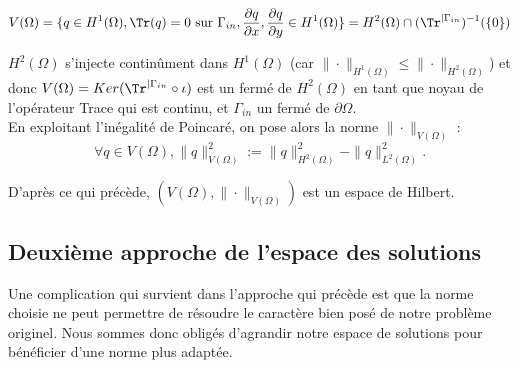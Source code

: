 \[V(\Omega)=\{q \in H^1(\Omega), \Tr(q)=0 \text{ sur } \Gamma_{in}, \frac{\partial q}{\partial x}, \frac{\partial q}{\partial y} \in H^1(\Omega) \} = H^2(\Omega) \cap (\Tr^{|\Gamma_{in}})^{-1}(\{0\}) \]

$H^2(\Omega)$ s'injecte continûment dans $H^1(\Omega)$ (car $\|\cdot\|_{H^1(\Omega)} \leq \|\cdot\|_{H^2(\Omega)}$)
et donc $V(\Omega) = Ker(\Tr^{|\Gamma_{in}}\circ \iota)$ est un fermé de $H^2(\Omega)$ en tant que noyau de l'opérateur Trace qui est continu, et $\Gamma_{in}$ un fermé de $\partial \Omega$.\\

En exploitant l'inégalité de Poincaré, on pose alors la norme 
$\|\cdot\|_{V(\Omega)}$ :
\[\forall q\in V(\Omega), \|q\|_{V(\Omega)}^2:= \|q\|_{H^2(\Omega)}^2 - \|q\|_{L^2(\Omega)}^2.\]

D'après ce qui précède, $(V(\Omega), \|\cdot\|_{V(\Omega)})$ est un espace de Hilbert.

\subsection{Deuxième approche de l'espace des solutions}

Une complication qui survient dans l'approche qui précède est que la norme choisie ne peut permettre de résoudre le caractère bien posé de notre problème originel. Nous sommes donc obligés d'agrandir notre espace de solutions pour bénéficier d'une norme plus adaptée. \\


